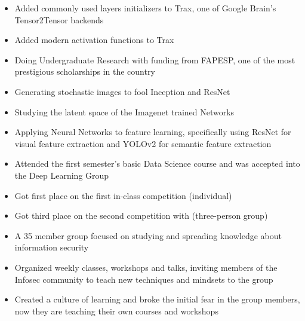 \documentclass[10pt,a4paper,ragged2e]{altacv}
\begin{document}
\begin{itemize}
    \item Added commonly used layers initializers to Trax, one of Google Brain's Tensor2Tensor backends
    \item Added modern activation functions to Trax
\end{itemize}
    \begin{itemize}
        \item Doing Undergraduate Research with funding from FAPESP, one of the most prestigious scholarships in the country
        \item Generating stochastic images to fool Inception and ResNet
        \item Studying the latent space of the Imagenet trained Networks
        \item Applying Neural Networks to feature learning, specifically using ResNet for visual feature extraction and YOLOv2 for semantic feature extraction
    \end{itemize}
\smallskip
{}
    \begin{itemize}
        \item Attended the first semester's basic Data Science course and was accepted into the Deep Learning Group
        \item Got first place on the first in-class competition (individual)
        \item Got third place on the second competition with (three-person group) 
    \end{itemize}
\smallskip
{}
    \begin{itemize}
        \item A 35 member group focused on studying and spreading knowledge about information security
        \item Organized weekly classes, workshops and talks, inviting members of the Infosec community to teach new techniques and mindsets to the group
        \item Created a culture of learning and broke the initial fear in the group members, now they are teaching their own courses and workshops
    \end{itemize}
\smallskip
{}
\end{document}
